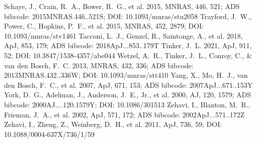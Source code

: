 \documentclass[twocolumn]{aastex631}
\begin{document}
\begin{thebibliography}{}
 Schaye, J., Crain, R.~A., Bower, R.~G., et al. 2015, MNRAS, 446, 521; ADS bibcode: 2015MNRAS.446..521S; DOI: 10.1093/mnras/stu2058
 Trayford, J.~W., Power, C., Hopkins, P.~F., et al. 2015, MNRAS, 452, 2879; DOI: 10.1093/mnras/stv1461
 Tacconi, L.~J., Genzel, R., Saintonge, A., et al. 2018, ApJ, 853, 179; ADS bibcode: 2018ApJ...853..179T
 Tinker, J.~L. 2021, ApJ, 911, 52; DOI: 10.3847/1538-4357/abe044
 Wetzel, A.~R., Tinker, J.~L., Conroy, C., \& van den Bosch, F.~C. 2013, MNRAS, 432, 336; ADS bibcode: 2013MNRAS.432..336W; DOI: 10.1093/mnras/stt410
 Yang, X., Mo, H.~J., van den Bosch, F.~C., et al. 2007, ApJ, 671, 153; ADS bibcode: 2007ApJ...671..153Y
 York, D.~G., Adelman, J., Anderson, J.~E., Jr., et al. 2000, AJ, 120, 1579; ADS bibcode: 2000AJ....120.1579Y; DOI: 10.1086/301513
 Zehavi, I., Blanton, M.~R., Frieman, J.~A., et al. 2002, ApJ, 571, 172; ADS bibcode: 2002ApJ...571..172Z
 Zehavi, I., Zheng, Z., Weinberg, D.~H., et al. 2011, ApJ, 736, 59; DOI: 10.1088/0004-637X/736/1/59
\end{thebibliography}
\end{document}
